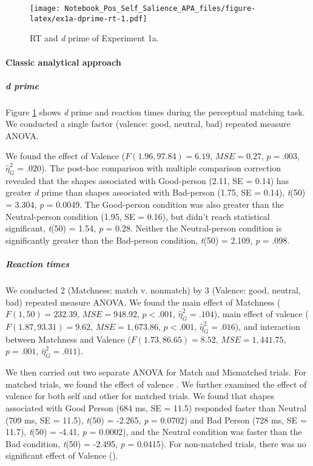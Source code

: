 \documentclass[
  english,
  man]{apa6}
\let\oldparagraph\paragraph
\renewcommand{\paragraph}[1]{\oldparagraph{#1}\mbox{}}
\let\oldsubparagraph\subparagraph
\renewcommand{\subparagraph}[1]{\oldsubparagraph{#1}\mbox{}}
\begin{document}
\begin{figure}
\centering
\texttt{[image: Notebook\_Pos\_Self\_Salience\_APA\_files/figure-latex/ex1a-dprime-rt-1.pdf]}
\caption{\label{fig:ex1a-dprime-rt}RT and \emph{d} prime of Experiment 1a.}
\end{figure}

\hypertarget{classic-analytical-approach}{%
\paragraph{Classic analytical approach}\label{classic-analytical-approach}}

\hypertarget{d-prime}{%
\subparagraph{\texorpdfstring{\emph{d} prime}{d prime}}\label{d-prime}}

Figure \ref{fig:ex1a-dprime-rt} shows \emph{d} prime and reaction times during the perceptual matching task. We conducted a single factor (valence: good, neutral, bad) repeated measure ANOVA.

We found the effect of Valence (\(F(1.96, 97.84) = 6.19\), \(\mathit{MSE} = 0.27\), \(p = .003\), \(\hat{\eta}^2_G = .020\)). The post-hoc comparison with multiple comparison correction revealed that the shapes associated with Good-person (2.11, SE = 0.14) has greater \emph{d} prime than shapes associated with Bad-person (1.75, SE = 0.14), \emph{t}(50) = 3.304, \emph{p} = 0.0049. The Good-person condition was also greater than the Neutral-person condition (1.95, SE = 0.16), but didn't reach statistical significant, \emph{t}(50) = 1.54, \emph{p} = 0.28. Neither the Neutral-person condition is significantly greater than the Bad-person condition, \emph{t}(50) = 2.109, \emph{p} = .098.

\hypertarget{reaction-times}{%
\subparagraph{Reaction times}\label{reaction-times}}

We conducted 2 (Matchness: match v. nonmatch) by 3 (Valence: good, neutral, bad) repeated measure ANOVA. We found the main effect of Matchness (\(F(1, 50) = 232.39\), \(\mathit{MSE} = 948.92\), \(p < .001\), \(\hat{\eta}^2_G = .104\)), main effect of valence (\(F(1.87, 93.31) = 9.62\), \(\mathit{MSE} = 1,673.86\), \(p < .001\), \(\hat{\eta}^2_G = .016\)), and interaction between Matchness and Valence (\(F(1.73, 86.65) = 8.52\), \(\mathit{MSE} = 1,441.75\), \(p = .001\), \(\hat{\eta}^2_G = .011\)).

We then carried out two separate ANOVA for Match and Mismatched trials. For matched trials, we found the effect of valence . We further examined the effect of valence for both self and other for matched trials. We found that shapes associated with Good Person (684 ms, SE = 11.5) responded faster than Neutral (709 ms, SE = 11.5), \emph{t}(50) = -2.265, \emph{p} = 0.0702) and Bad Person (728 ms, SE = 11.7), \emph{t}(50) = -4.41, \emph{p} = 0.0002), and the Neutral condition was faster than the Bad condition, \emph{t}(50) = -2.495, \emph{p} = 0.0415). For non-matched trials, there was no significant effect of Valence ().
\end{document}
